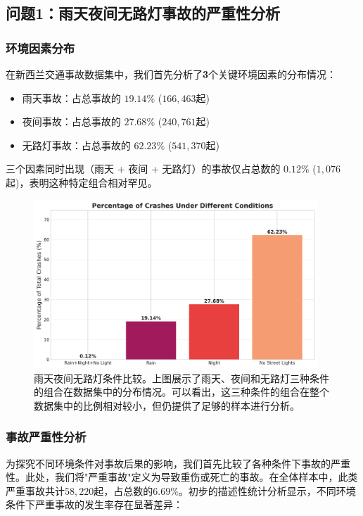 \documentclass[12pt,a4paper]{article}
\begin{document}
\subsection{问题1：雨天夜间无路灯事故的严重性分析}

\subsubsection{环境因素分布}

在新西兰交通事故数据集中，我们首先分析了\textbf{3}个关键环境因素的分布情况：

\begin{itemize}
\item 雨天事故：占总事故的 $19.14\%$ ($166,463$起)
\item 夜间事故：占总事故的 $27.68\%$ ($240,761$起)
\item 无路灯事故：占总事故的 $62.23\%$ ($541,370$起)
\end{itemize}

三个因素同时出现（雨天 + 夜间 + 无路灯）的事故仅占总数的 $0.12\%$ ($1,076$起)，表明这种特定组合相对罕见。

\begin{figure}[!htbp]
  \centering
  \includegraphics[width=0.95\textwidth]{rain_night_no_light_comparison.png}
  \caption{雨天夜间无路灯条件比较。上图展示了雨天、夜间和无路灯三种条件的组合在数据集中的分布情况。可以看出，这三种条件的组合在整个数据集中的比例相对较小，但仍提供了足够的样本进行分析。}
  \label{fig:condition_comparison}
\end{figure}

\subsubsection{事故严重性分析}

为探究不同环境条件对事故后果的影响，我们首先比较了各种条件下事故的严重性。此处，我们将"严重事故"定义为导致重伤或死亡的事故。在全体样本中，此类严重事故共计$58,220$起，占总数的$6.69\%$。初步的描述性统计分析显示，不同环境条件下严重事故的发生率存在显著差异：
\end{document}

